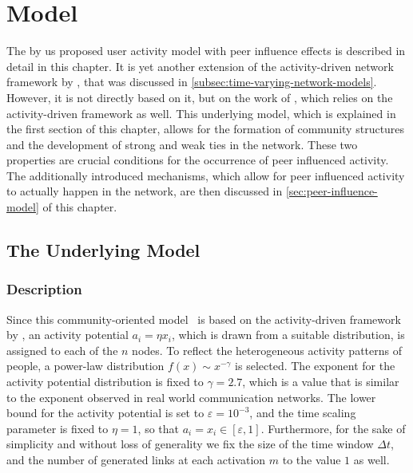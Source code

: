 \chapter{Model}
\label{cha:model}


The by us proposed user activity model with peer influence effects is described in detail in this chapter.
It is yet another extension of the activity-driven network framework by \citet{Perra2012a}, that was discussed in \cref{subsec:time-varying-network-models}.
However, it is not directly based on it, but on the work of \citet{Laurent2015}, which relies on the activity-driven framework as well.
This underlying model, which is explained in the first section of this chapter, allows for the formation of community structures and the development of strong and weak ties in the network.
These two properties are crucial conditions for the occurrence of peer influenced activity.
The additionally introduced mechanisms, which allow for peer influenced activity to actually happen in the network, are then discussed in \cref{sec:peer-influence-model} of this chapter.




\section{The Underlying Model}
\label{sec:underlying-model}


\subsection{Description}

Since this community-oriented model~\cite{Laurent2015} is based on the activity-driven framework by \citet{Perra2012a}, an activity potential \( a_{i} = \eta x_{i} \),  which is drawn from a suitable distribution, is assigned to each of the \( n \) nodes.
To reflect the heterogeneous activity patterns of people, a power-law distribution \( f(x) \sim x^{-\gamma} \) is selected.
The exponent for the activity potential distribution is fixed to \( \gamma = 2.7 \), which is a value that is similar to the exponent observed in real world communication networks.
The lower bound for the activity potential is set to \( \varepsilon = 10^{-3} \), and the time scaling parameter is fixed to \( \eta = 1 \), so that \( a_{i} = x_{i} \in [\varepsilon, 1] \).
Furthermore, for the sake of simplicity and without loss of generality we fix the size of the time window \( \Delta t \), and the number of generated links at each activation \( m \) to the value \( 1 \) as well.

